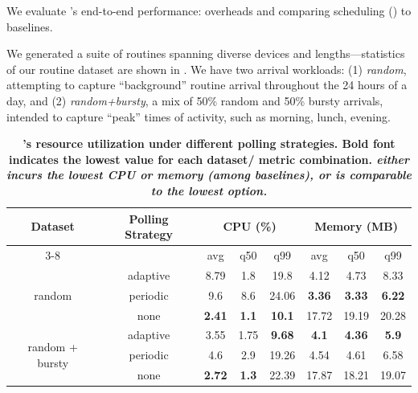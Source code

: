 We evaluate \sysname's end-to-end performance: overheads and comparing \scheduler{} scheduling () to baselines.

We generated a suite of routines spanning diverse devices and lengths---statistics of our routine dataset are shown in .
We have two arrival workloads: (1) {\it random}, attempting to capture ``background'' routine arrival throughout the 24 hours of a day, 
and (2)  {\it random+bursty}, a mix of 50\% random and 50\% bursty arrivals, 
intended to capture ``peak'' times of activity, such as morning, lunch, evening. 

\begin{table}[tb!]
    \centering
    \small
    \caption{\bf \small \sysname's resource utilization under different polling strategies. Bold font indicates the lowest value for each dataset/ metric combination. {\it \sysname{} either incurs the lowest CPU or memory (among baselines), or is comparable to
    the lowest option.}}
    \bigskip
    \label{rasc:tab:resource-overheads}
    \begin{tabular}{|c|c|c|c|c|c|c|c|}
        \hline
        \multirow{2}{*}{Dataset} & \multirow{2}{*}{Polling Strategy} & \multicolumn{3}{c|}{CPU (\%)} & \multicolumn{3}{c|}{Memory (MB)} \\
        \cline{3-8}  %
         & & avg & q50 & q99 & avg & q50 & q99 \\
        \hline\hline
        \multirow{3}{*}{random} & adaptive & 8.79 & 1.8 & 19.8 & 4.12 & 4.73 & 8.33 \\
         & periodic & 9.6 & 8.6 & 24.06 & \textbf{3.36} & \textbf{3.33} & \textbf{6.22} \\
         & none & \textbf{2.41} & \textbf{1.1} & \textbf{10.1} & 17.72 & 19.19 & 20.28 \\
        \hline
        \multirow{3}{*}{random + bursty} & adaptive & 3.55 & 1.75 & \textbf{9.68} & \textbf{4.1} & \textbf{4.36} & \textbf{5.9} \\
         & periodic & 4.6 & 2.9 & 19.26 & 4.54 & 4.61 & 6.58 \\
         & none & \textbf{2.72} & \textbf{1.3} & 22.39 & 17.87 & 18.21 & 19.07 \\
        \hline
    \end{tabular}
\end{table}

